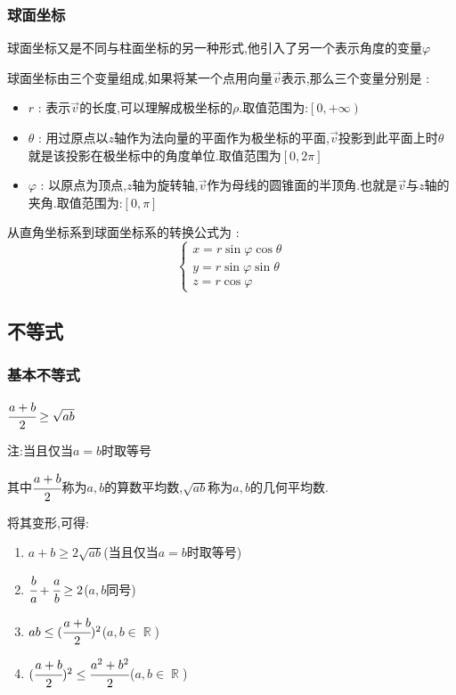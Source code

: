 \documentclass[UTF8,12pt]{ctexbook}
\newcommand{\mediumBigCase}[1]{\left[#1\right]}
\DeclareMathOperator{\mathRealNumberCollection}{\mathbb{R}}
\begin{document}
{{{  \subsubsection{球面坐标}{
    球面坐标又是不同与柱面坐标的另一种形式,他引入了另一个表示角度的变量$\varphi$

    球面坐标由三个变量组成,如果将某一个点用向量$\vec{v}$表示,那么三个变量分别是 :
    \begin{itemize}
      \item $r$ : 表示$\vec{v}$的长度,可以理解成极坐标的$\rho$.取值范围为:$\left[0,+\infty\right)$
      \item $\theta$ : 用过原点以$z$轴作为法向量的平面作为极坐标的平面,$\vec{v}$投影到此平面上时$\theta$就是该投影在极坐标中的角度单位.取值范围为$\mediumBigCase{0,2\pi}$
      \item $\varphi$ : 以原点为顶点,$z$轴为旋转轴,$\vec{v}$作为母线的圆锥面的半顶角.也就是$\vec{v}$与$z$轴的夹角.取值范围为:$\mediumBigCase{0,\pi}$
    \end{itemize}

    从直角坐标系到球面坐标系的转换公式为 :
    $$
      \begin{cases}
        x = r\sin\varphi\cos\theta \\
        y = r\sin\varphi\sin\theta \\
        z = r\cos\varphi
      \end{cases}
    $$
  }%

}%

\subsection{不等式}{

\subsubsection{基本不等式}{
  $\cfrac{a + b}{2} \geq \sqrt{ab}$

  注:当且仅当$a = b$时取等号

  其中$\cfrac{a+b}{2}$称为$a,b$的算数平均数,$\sqrt{ab}$称为$a,b$的几何平均数.

  将其变形,可得:
  \begin{enumerate}
    \item $a + b \geq 2\sqrt{ab}$(当且仅当$a = b$时取等号)
    \item $\cfrac{b}{a} + \cfrac{a}{b} \geq 2$($a,b$同号)
    \item $ab \leq (\cfrac{a + b}{2})^2$($a,b\in\mathRealNumberCollection$)
    \item $(\cfrac{a + b}{2})^2 \leq \cfrac{a^2 + b^2}{2}$($a,b\in\mathRealNumberCollection$)
  \end{enumerate}
}%


}}}
\end{document}
